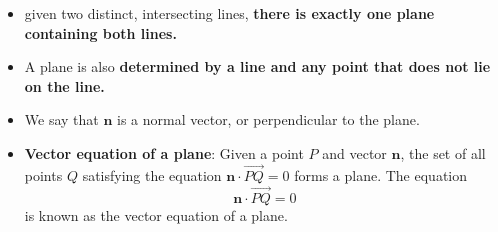 \documentclass{report}
\begin{document}
\begin{itemize}
        \item given two distinct, intersecting lines, \textbf{there is exactly one plane containing both lines.}
        \item A plane is also \textbf{determined by a line and any point that does not lie on the line.}
        \item We say that  $\mathbf{n}$ is a normal vector, or perpendicular to the plane.
        \item \textbf{Vector equation of a plane}:
            Given a point $P$ and vector $\mathbf{n}$, the set of all points $Q$ satisfying the equation $\mathbf{n} \cdot \overrightarrow{PQ} = 0$ forms a plane. The equation
            \[
                \mathbf{n} \cdot \overrightarrow{PQ} = 0
            \]
            is known as the vector equation of a plane.


\end{itemize}
\end{document}
